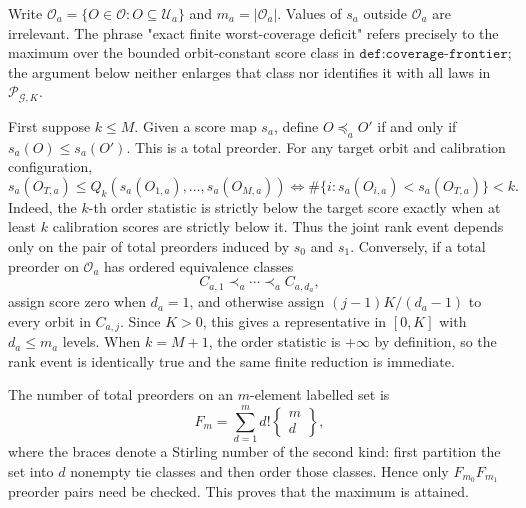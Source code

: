 Write \(\mathcal O_a=\{O\in\mathcal O:O\subseteq\mathcal U_a\}\) and \(m_a=|\mathcal O_a|\). Values of \(s_a\) outside \(\mathcal O_a\) are irrelevant. The phrase "exact finite worst-coverage deficit" refers precisely to the maximum over the bounded orbit-constant score class in \(\texttt{def:coverage-frontier}\); the argument below neither enlarges that class nor identifies it with all laws in \(\mathcal P_{\mathcal G,K}\).

First suppose \(k\le M\). Given a score map \(s_a\), define \(O\preceq_a O'\) if and only if \(s_a(O)\le s_a(O')\). This is a total preorder. For any target orbit and calibration configuration,
\[s_a(O_{T,a})\le Q_k(s_a(O_{1,a}),\ldots,s_a(O_{M,a}))\iff \#\{i:s_a(O_{i,a})<s_a(O_{T,a})\}<k.\tag{1}\]
Indeed, the \(k\)-th order statistic is strictly below the target score exactly when at least \(k\) calibration scores are strictly below it. Thus the joint rank event depends only on the pair of total preorders induced by \(s_0\) and \(s_1\). Conversely, if a total preorder on \(\mathcal O_a\) has ordered equivalence classes
\[C_{a,1}\prec_a\cdots\prec_a C_{a,d_a},\]
assign score zero when \(d_a=1\), and otherwise assign \((j-1)K/(d_a-1)\) to every orbit in \(C_{a,j}\). Since \(K>0\), this gives a representative in \([0,K]\) with \(d_a\le m_a\) levels. When \(k=M+1\), the order statistic is \(+\infty\) by definition, so the rank event is identically true and the same finite reduction is immediate.

The number of total preorders on an \(m\)-element labelled set is
\[F_m=\sum_{d=1}^m d!\left\{\begin{matrix}m\\d\end{matrix}\right\},\tag{2}\]
where the braces denote a Stirling number of the second kind: first partition the set into \(d\) nonempty tie classes and then order those classes. Hence only \(F_{m_0}F_{m_1}\) preorder pairs need be checked. This proves that the maximum is attained.

